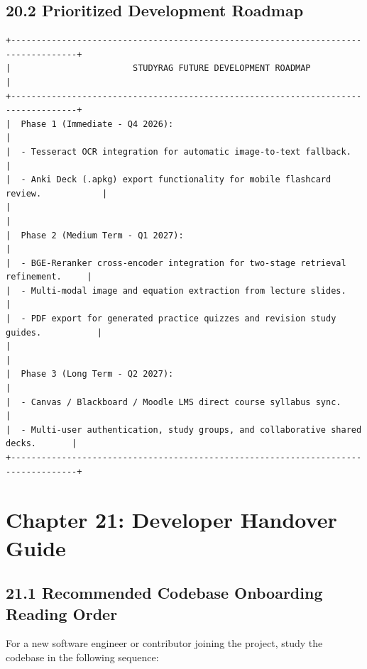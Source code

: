 \documentclass[
]{article}
\begin{document}
\subsection{20.2 Prioritized Development
Roadmap}\label{prioritized-development-roadmap}

\begin{verbatim}
+-----------------------------------------------------------------------------------+
|                        STUDYRAG FUTURE DEVELOPMENT ROADMAP                        |
+-----------------------------------------------------------------------------------+
|  Phase 1 (Immediate - Q4 2026):                                                   |
|  - Tesseract OCR integration for automatic image-to-text fallback.                |
|  - Anki Deck (.apkg) export functionality for mobile flashcard review.            |
|                                                                                   |
|  Phase 2 (Medium Term - Q1 2027):                                                 |
|  - BGE-Reranker cross-encoder integration for two-stage retrieval refinement.     |
|  - Multi-modal image and equation extraction from lecture slides.                 |
|  - PDF export for generated practice quizzes and revision study guides.           |
|                                                                                   |
|  Phase 3 (Long Term - Q2 2027):                                                   |
|  - Canvas / Blackboard / Moodle LMS direct course syllabus sync.                  |
|  - Multi-user authentication, study groups, and collaborative shared decks.       |
+-----------------------------------------------------------------------------------+
\end{verbatim}

\section{Chapter 21: Developer Handover
Guide}\label{chapter-21-developer-handover-guide}

\subsection{21.1 Recommended Codebase Onboarding Reading
Order}\label{recommended-codebase-onboarding-reading-order}

For a new software engineer or contributor joining the project, study
the codebase in the following sequence:
\end{document}
